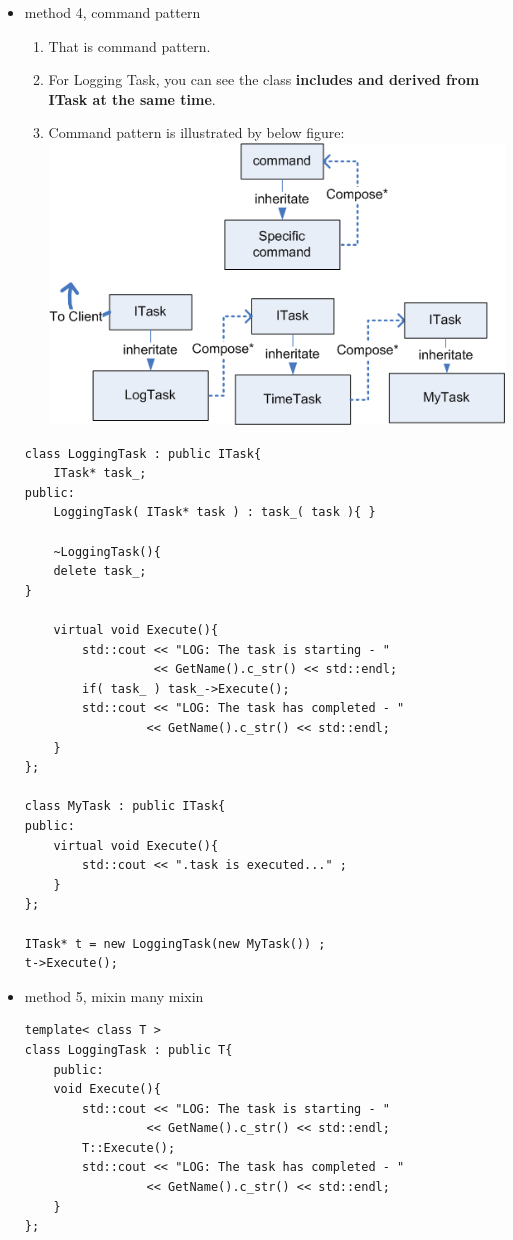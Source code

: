 \documentclass[a4paper,11pt,twoside]{book}
\begin{document}
\begin{itemize}
	\item method 4, command pattern
	\begin{enumerate}
		\item That is command pattern.
		\item For Logging Task, you can see the class \textbf{includes and derived from ITask at the same time}. 
		\item Command pattern is illustrated by below figure:
		\newline
		\includegraphics[scale=1.1]{pics/command.png}
	\end{enumerate}
\begin{lstlisting}[numbers=none]
class LoggingTask : public ITask{
	ITask* task_;
public:
	LoggingTask( ITask* task ) : task_( task ){ }
	
	~LoggingTask(){
	delete task_;
}
	
	virtual void Execute(){
		std::cout << "LOG: The task is starting - " 
		          << GetName().c_str() << std::endl;
		if( task_ ) task_->Execute();
		std::cout << "LOG: The task has completed - " 
		         << GetName().c_str() << std::endl;
	}
};
	
class MyTask : public ITask{
public:
	virtual void Execute(){
		std::cout << ".task is executed..." ;
	}
};
	
ITask* t = new LoggingTask(new MyTask()) ;
t->Execute();
\end{lstlisting}
	
	
	\item method 5, mixin many mixin

\begin{lstlisting}[numbers=none]
template< class T >
class LoggingTask : public T{
	public:
	void Execute(){
		std::cout << "LOG: The task is starting - " 
		         << GetName().c_str() << std::endl;
		T::Execute();
		std::cout << "LOG: The task has completed - " 
		         << GetName().c_str() << std::endl;
	}
};
	

\end{lstlisting}
\end{itemize}
\end{document}
